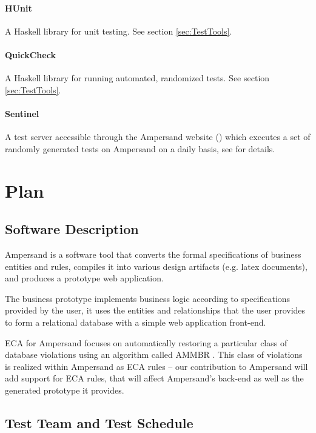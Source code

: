 \documentclass[12pt]{report}
\begin{document}
\subsubsection*{HUnit}
 A Haskell library for unit testing. See section \ref{sec:TestTools}.
\subsubsection*{QuickCheck}
 A Haskell library for running automated, randomized tests. See section 
 \ref{sec:TestTools}.
 
 \subsubsection*{Sentinel}
A test server accessible through the Ampersand website
(\cite{sentinellink}) which executes a set of 
randomly generated tests on Ampersand on a daily basis, see \cite{sentinel} for details.

%
%

\chapter{Plan}\label{ch:Plan}

\section{Software Description}\label{sec:SoftwareDesc}
Ampersand is a software tool that converts the formal specifications of 
business entities and rules, compiles it into various design artifacts (e.g. 
latex documents), and produces a prototype web application.

The business prototype implements business logic according to specifications 
provided by the user, it uses the entities and relationships that the user 
provides to form a relational database with a simple web application front-end.

ECA for Ampersand focuses on automatically restoring a particular class of 
database violations using an algorithm called AMMBR \cite{amber}.  This class 
of violations is realized within Ampersand as ECA rules -- our contribution to 
Ampersand will add support for ECA rules, that will affect Ampersand's back-end 
as well as the generated prototype it provides.

\section{Test Team and Test Schedule}\label{sec:TestTeamSchedule} 
\end{document}
